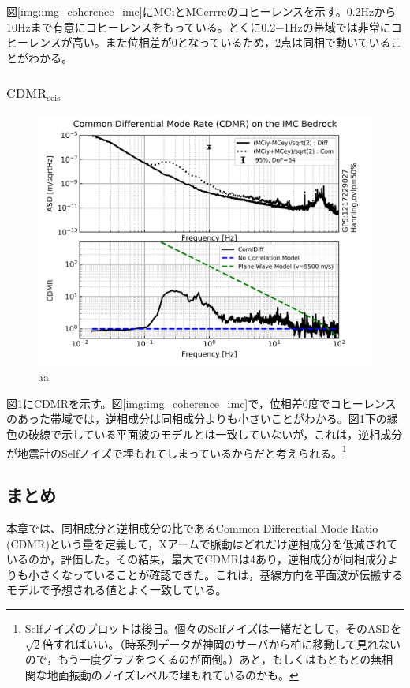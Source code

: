 図\ref{img:img_coherence_imc}にMCiとMCerrreのコヒーレンスを示す。0.2Hzから10Hzまで有意にコヒーレンスをもっている。とくに0.2−1Hzの帯域では非常にコヒーレンスが高い。また位相差が0となっているため，2点は同相で動いていることがわかる。



\subsubsection{$\mathrm{CDMR_{seis}}$}
\begin{figure}[H]
  \begin{center}
    \includegraphics[width=11.5cm]{./img_cdmr_imc.png}
  \end{center}
  \caption{aa}\label{img:img_cdmr_imc}
\end{figure}
図\ref{img:img_cdmr_imc}にCDMRを示す。図\ref{img:img_coherence_imc}で，位相差0度でコヒーレンスのあった帯域では，逆相成分は同相成分よりも小さいことがわかる。図\ref{img:img_cdmr_imc}下の緑色の破線で示している平面波のモデルとは一致していないが，これは，逆相成分が地震計のSelfノイズで埋もれてしまっているからだと考えられる。\footnote[12]{Selfノイズのプロットは後日。個々のSelfノイズは一緒だとして，そのASDを$\sqrt{2}$倍すればいい。（時系列データが神岡のサーバから柏に移動して見れないので，もう一度グラフをつくるのが面倒。）あと，もしくはもともとの無相関な地面振動のノイズレベルで埋もれているのかも。}






\subsection{まとめ}
本章では、同相成分と逆相成分の比であるCommon Differential Mode Ratio (CDMR)という量を定義して，Xアームで脈動はどれだけ逆相成分を低減されているのか，評価した。その結果，最大でCDMRは4あり，逆相成分が同相成分よりも小さくなっていることが確認できた。これは，基線方向を平面波が伝搬するモデルで予想される値とよく一致している。

